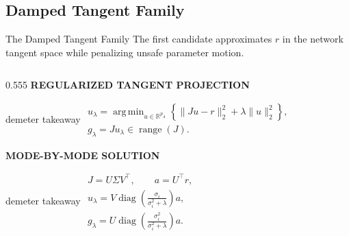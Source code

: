 \subsection{Damped Tangent Family}

\begin{frame}[t]{The Damped Tangent Family}
  \vspace{-0.08cm}
  {\fontsize{7.6}{9.0}\selectfont
  The first candidate approximates $r$ in the network tangent space while
  penalizing unsafe parameter motion.}

  \vspace{0.11cm}
  \begin{columns}[T,onlytextwidth]
    \begin{column}{0.555\textwidth}
      {\color{EnstaBlue}\bfseries\scriptsize REGULARIZED TANGENT PROJECTION}
      \vspace{0.04cm}

      \begin{beamercolorbox}[rounded=true,sep=0.12cm,wd=\linewidth]{demeter takeaway}
        \centering
        \fontsize{7.0}{8.3}\selectfont
        \(\displaystyle
          \begin{gathered}
            u_\lambda=\operatorname*{arg\,min}_{u\in\mathbb R^{p_A}}
            \left\{\lVert Ju-r\rVert_2^2+\lambda\lVert u\rVert_2^2\right\},\\[5pt]
            g_\lambda=Ju_\lambda\in\operatorname{range}(J).
          \end{gathered}
        \)
      \end{beamercolorbox}

      \vspace{0.11cm}
      {\color{EnstaBlue}\bfseries\scriptsize MODE-BY-MODE SOLUTION}
      \vspace{0.04cm}

      \begin{beamercolorbox}[rounded=true,sep=0.12cm,wd=\linewidth]{demeter takeaway}
        \centering
        \fontsize{6.8}{8.1}\selectfont
        \(\displaystyle
          \begin{gathered}
            J=U\Sigma V^\top,\qquad a=U^\top r,\\[4pt]
            u_\lambda
            =V\operatorname{diag}\!\left(
              \frac{\sigma_i}{\sigma_i^2+\lambda}
            \right)a,\\[4pt]
            g_\lambda
            =U\operatorname{diag}\!\left(
              \frac{\sigma_i^2}{\sigma_i^2+\lambda}
            \right)a.
          \end{gathered}
        \)
      \end{beamercolorbox}


\end{column}
\end{columns}
\end{frame}
